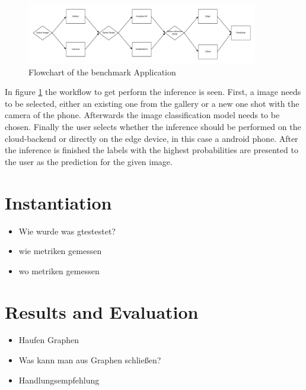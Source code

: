 \begin{figure}[H]
\centering
\includegraphics[width=0.9\textwidth]{./Bilder/FlowChart_App.png}
\caption{Flowchart of the benchmark Application}
\label{fig:app}
\end{figure}
In figure \ref{fig:app} the workflow to get perform the inference is seen. First, a image needs to be selected, either an existing one from the gallery or a new one shot with the camera of the phone. Afterwards the image classification model needs to be chosen. Finally the user selects whether the inference should be performed on the cloud-backend or directly on the edge device, in this case a android phone. After the inference is finished the labels with the highest probabilities are presented to the user as the prediction for the given image.
\section{Instantiation}
\begin{itemize}
    \item Wie wurde was gtestestet?
    \item wie metriken gemessen
    \item wo metriken gemessen
\end{itemize}
\section{Results and Evaluation}
\begin{itemize}
    \item Haufen Graphen
    \item Was kann man aus Graphen schließen?
    \item Handlungsempfehlung
\end{itemize}
\endinput 
